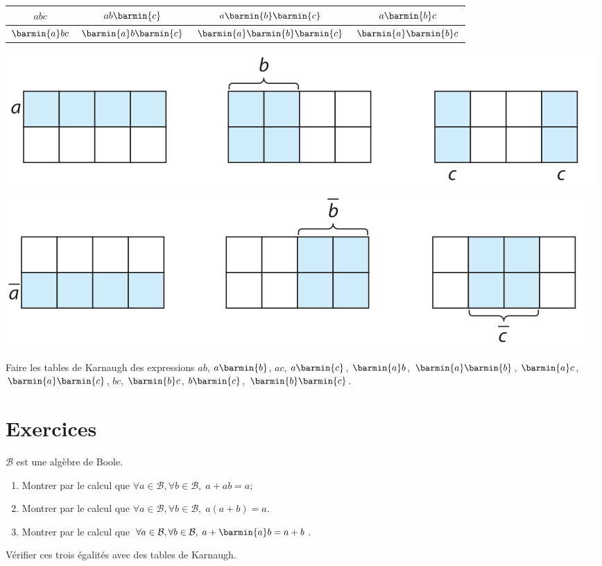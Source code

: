 \begin{center}
    \begin{tabular}{|c|c|c|c|}

        \hline
        $abc$          & $ab\barmin{c}$          & $a\barmin{b}\barmin{c}$          & $a\barmin{b}c$          \\
        \hline
        $\barmin{a}bc$ & $\barmin{a}b\barmin{c}$ & $\barmin{a}\barmin{b}\barmin{c}$ & $\barmin{a}\barmin{b}c$ \\
        \hline
    \end{tabular}
\end{center}
\begin{center}
    \includegraphics[width=\linewidth]{boole/img/karnaugh2.png}\\

    \includegraphics[width=\linewidth]{boole/img/karnaugh3.png}
\end{center}

\begin{exercice}[]
    Faire les tables de Karnaugh des expressions $ab$, $a\barmin{b}$, $ac$, $a\barmin{c}$,  $\barmin{a}b$, $\barmin{a}\barmin{b}$, $\barmin{a}c$, $\barmin{a}\barmin{c}$, $bc$, $\barmin{b}c$, $b\barmin{c}$, $\barmin{b}\barmin{c}$.
\end{exercice}

\section{Exercices}

\begin{exercice}
    $\mathcal{B}$ est une algèbre de Boole.
    \begin{enumerate}
        \item 	Montrer par le calcul que $\forall a\in\mathcal{B},\forall b\in\mathcal{B},\; a+ab = a$;
        \item 	Montrer par le calcul que $\forall a\in\mathcal{B},\forall b\in\mathcal{B},\; a(a+b) = a$.
        \item 	Montrer par le calcul que $\forall a\in\mathcal{B},\forall b\in\mathcal{B},\; a+\barmin{a}b = a+b$.
    \end{enumerate}
    Vérifier ces trois égalités avec des tables de Karnaugh.
\end{exercice}

